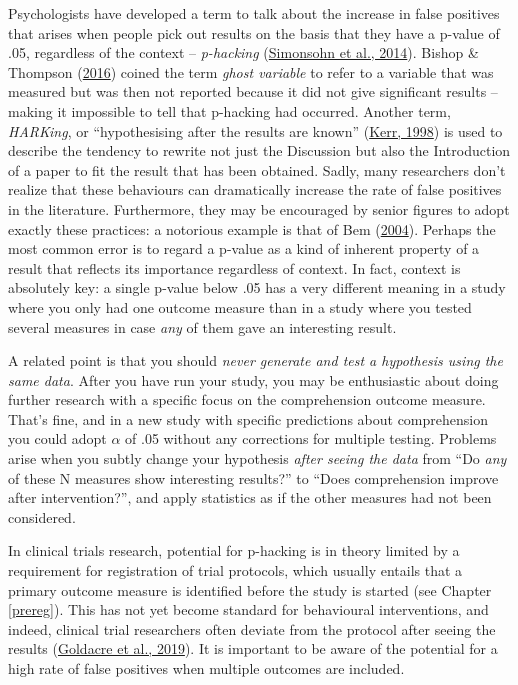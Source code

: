 \documentclass{krantz}
\begin{document}
Psychologists have developed a term to talk about the increase in false positives that arises when people pick out results on the basis that they have a p-value of .05, regardless of the context -- \emph{p-hacking} (\protect\hyperlink{ref-simonsohn2014a}{Simonsohn et al., 2014}). Bishop \& Thompson (\protect\hyperlink{ref-bishop2016}{2016}) coined the term \emph{ghost variable} to refer to a variable that was measured but was then not reported because it did not give significant results -- making it impossible to tell that p-hacking had occurred. Another term, \emph{HARKing}, or ``hypothesising after the results are known'' (\protect\hyperlink{ref-kerr1998}{Kerr, 1998}) is used to describe the tendency to rewrite not just the Discussion but also the Introduction of a paper to fit the result that has been obtained. Sadly, many researchers don't realize that these behaviours can dramatically increase the rate of false positives in the literature. Furthermore, they may be encouraged by senior figures to adopt exactly these practices: a notorious example is that of Bem (\protect\hyperlink{ref-bem2004}{2004}). Perhaps the most common error is to regard a p-value as a kind of inherent property of a result that reflects its importance regardless of context. In fact, context is absolutely key: a single p-value below .05 has a very different meaning in a study where you only had one outcome measure than in a study where you tested several measures in case \emph{any} of them gave an interesting result.

A related point is that you should \emph{never generate and test a hypothesis using the same data}. After you have run your study, you may be enthusiastic about doing further research with a specific focus on the comprehension outcome measure. That's fine, and in a new study with specific predictions about comprehension you could adopt \(\alpha\) of .05 without any corrections for multiple testing. Problems arise when you subtly change your hypothesis \emph{after seeing the data} from ``Do \emph{any} of these N measures show interesting results?'' to ``Does comprehension improve after intervention?'', and apply statistics as if the other measures had not been considered.

In clinical trials research, potential for p-hacking is in theory limited by a requirement for registration of trial protocols, which usually entails that a primary outcome measure is identified before the study is started (see Chapter \ref{prereg}). This has not yet become standard for behavioural interventions, and indeed, clinical trial researchers often deviate from the protocol after seeing the results (\protect\hyperlink{ref-goldacre2019}{Goldacre et al., 2019}). It is important to be aware of the potential for a high rate of false positives when multiple outcomes are included.
\end{document}
